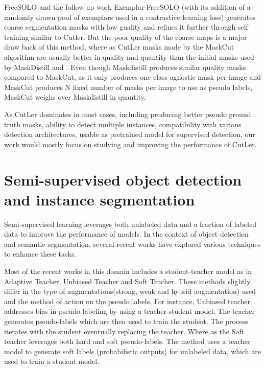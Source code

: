 FreeSOLO\cite{wang2022freesolo} and the follow up work Exemplar-FreeSOLO\cite{Ishtiak_2023_CVPR} (with its addition of a randomly drawn pool of exemplars used in a contrastive learning loss) generates coarse segmentation masks with low guality and refines it further through self training similar to Cutler. But the poor quality of the coarse maps is a major draw back of this method, where as CutLer masks made by the MaskCut\cite{wang2023cut, wang2022tokencut} algorithm are usually better in quality and quantity than the initial masks used by MaskDistill\cite{vangansbeke2022discovering} and \cite{wang2022freesolo}. Even though Maskdistill produces similar quality masks compared to MaskCut, as it only produces one class agnostic mask per image and MaskCut produces N fixed number of masks per image to use as pseudo labels, MaskCut weighs over Maskdistill in quantity.

As CutLer dominates in most cases, including producing better pseudo ground truth masks, ability to detect multiple instances, compatibility with various detection architectures, usable as pretrained model for supervised detection, our work would mostly focus on studying and improving the performance of CutLer.

\section{Semi-supervised object detection and instance segmentation}
Semi-supervised learning leverages both unlabeled data and a fraction of labeled data to improve the performance of models. In the context of object detection and semantic segmentation, several recent works have explored various techniques to enhance these tasks.

Most of the recent works in this domain includes a student-teacher model as in  Adaptive Teacher\cite{Li_2022_CVPR}, Unbiased Teacher\cite{liu2021unbiasedteachersemisupervisedobject} and Soft Teacher\cite{xu2021endtoendsemisupervisedobjectdetection}. These methods slightly differ in the type of augmentations(strong, weak and hybrid augmentation) used and the method of action on the pseudo labels. For instance, Unbiased teacher addresses bias in pseudo-labeling by using a teacher-student model. The teacher generates pseudo-labels which are then used to train the student. The process iterates with the student eventually replacing the teacher. Where as the Soft teacher leverages both hard and soft pseudo-labels. The method uses a teacher model to generate soft labels (probabilistic outputs) for unlabeled data, which are used to train a student model.

